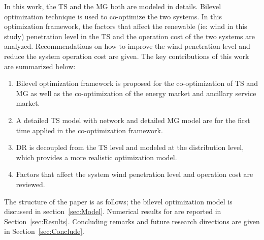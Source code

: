 In this work, the TS and the MG both are modeled in details. Bilevel optimization technique is used to co-optimize the two systems. In this optimization framework, the factors that affect the renewable (ie: wind in this study) penetration level in the TS and the operation cost of the two systems are analyzed. Recommendations on how to improve the wind penetration level and reduce the system operation cost are given. The key contributions of this work are summarized below:
\begin{enumerate}[(1)]
\item Bilevel optimization framework is proposed for the co-optimization of TS and MG as well as the co-optimization of the energy market and ancillary service market. 
\item A detailed TS model with network and detailed MG model are for the first time applied in the co-optimization framework.
\item DR is decoupled from the TS level and modeled at the distribution level, which provides a more realistic optimization model.
\item Factors that affect the system wind penetration level and operation cost are reviewed. 
\end{enumerate}

The structure of the paper is as follows; the bilevel optimization model is discussed in section~\ref{sec:Model}.  Numerical results for  are reported in Section~\ref{sec:Results}. Concluding remarks and future research directions are given in Section~\ref{sec:Conclude}. 


